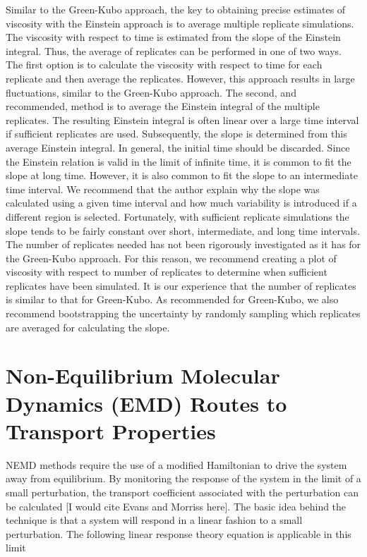 \documentclass[9pt]{livecoms}
\begin{document}
Similar to the Green-Kubo approach, the key to obtaining precise estimates of viscosity with the Einstein approach is to average multiple replicate simulations. The viscosity with respect to time is estimated from the slope of the Einstein integral. Thus, the average of replicates can be performed in one of two ways. The first option is to calculate the viscosity with respect to time for each replicate and then average the replicates. However, this approach results in large fluctuations, similar to the Green-Kubo approach. The second, and recommended, method is to average the Einstein integral of the multiple replicates. The resulting Einstein integral is often linear over a large time interval if sufficient replicates are used. Subsequently, the slope is determined from this average Einstein integral. In general, the initial time should be discarded. Since the Einstein relation is valid in the limit of infinite time, it is common to fit the slope at long time. However, it is also common to fit the slope to an intermediate time interval. We recommend that the author explain why the slope was calculated using a given time interval and how much variability is introduced if a different region is selected. Fortunately, with sufficient replicate simulations the slope tends to be fairly constant over short, intermediate, and long time intervals. The number of replicates needed has not been rigorously investigated as it has for the Green-Kubo approach. For this reason, we recommend creating a plot of viscosity with respect to number of replicates to determine when sufficient replicates have been simulated. It is our experience that the number of replicates is similar to that for Green-Kubo. As recommended for Green-Kubo, we also recommend bootstrapping the uncertainty by randomly sampling which replicates are averaged for calculating the slope.

\section{Non-Equilibrium Molecular Dynamics (EMD) Routes to Transport Properties}

NEMD methods require the use of a modified Hamiltonian to drive the system away from equilibrium. By monitoring the response of the system in the limit of a small perturbation, the transport coefficient associated with the perturbation can be calculated [I would cite Evans and Morriss here]. The basic idea behind the technique is that a system will respond in a linear fashion to a small perturbation. The following linear response theory equation is applicable in this limit
\end{document}
